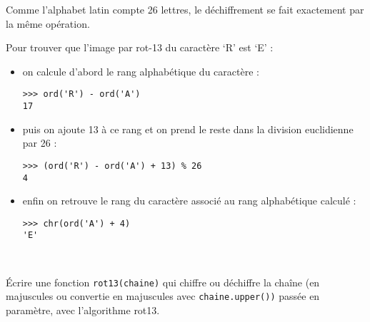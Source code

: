 \documentclass[11pt,a4paper]{article}
\providecommand{\tightlist}{\setlength{\itemsep}{0pt}\setlength{\parskip}{0pt}}
\begin{document}
Comme l'alphabet latin compte 26 lettres, le déchiffrement se fait
exactement par la même opération.

Pour trouver que l'image par rot-13 du caractère `R' est `E' :

\begin{itemize}
\tightlist
\item
  on calcule d'abord le rang alphabétique du caractère :

\begin{center}
\begin{minipage}{5cm}
\begin{verbatim}
>>> ord('R') - ord('A')
17    
\end{verbatim}
\end{minipage}
\end{center}
 
\item
  puis on ajoute 13 à ce rang et on prend le reste dans la division
  euclidienne par 26 :

\begin{center}
\begin{minipage}{8cm}
\begin{verbatim}
>>> (ord('R') - ord('A') + 13) % 26
4
\end{verbatim}
\end{minipage}
\end{center}

\item
  enfin on retrouve le rang du caractère associé au rang alphabétique
  calculé :

\begin{center}
\begin{minipage}{5cm}
\begin{verbatim}
>>> chr(ord('A') + 4)
'E'
\end{verbatim}
\end{minipage}
\end{center}
  \
\end{itemize}

Écrire une fonction \texttt{rot13(chaine)} qui chiffre ou déchiffre la
chaîne (en majuscules ou convertie en majuscules avec
\texttt{chaine.upper())} passée en paramètre, avec l'algorithme rot13.
\end{document}
